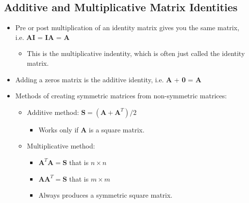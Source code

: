 \documentclass[12pt,a4paper]{article}
\begin{document}
\subsection{Additive and Multiplicative Matrix Identities}
\begin{itemize}
    \item Pre or post multiplication of an identity matrix gives you the same matrix, i.e. \textbf{AI} = \textbf{IA} = \textbf{A}
        \begin{itemize}
            \item This is the {\color{o-Sun}multiplicative indentity}, which is often just called the identity matrix.
        \end{itemize}
    \item Adding a zeros matrix is the {\color{o-Sun}additive identity}, i.e. \textbf{A} + \textbf{0} = \textbf{A}
    \item Methods of creating symmetric matrices from non-symmetric matrices:
        \begin{itemize}
            \item Additive method: \(\textbf{S} = (\textbf{A}+\textbf{A}^T)/2\) 
                \begin{itemize}
                    \item Works only if \textbf{A} is a square matrix.
                \end{itemize}
            \item Multiplicative method: 
                \begin{itemize}
                    \item \(\textbf{A}^T\textbf{A}=\textbf{S}\) that is \(n\times n\)
                    \item \(\textbf{A}\textbf{A}^T=\textbf{S}\) that is \(m\times m\)
                    \item Always produces a {\color{o-Sun}symmetric square} matrix.
                \end{itemize}
        \end{itemize}
\end{itemize}
\end{document}
